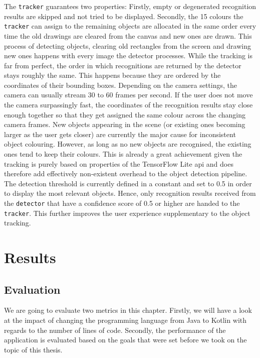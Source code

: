 \documentclass[
			   fontsize=11pt,
               paper=a4,
               bibliography=totoc,
               idxtotoc,
               headsepline,
               footsepline,
               footinclude=false,
               BCOR=12mm,
               DIV=13,
               openany,   %
               ]
               {scrbook}
\newcommand{\code}[1]{\lstinline[basicstyle = \ttfamily\small]{#1}} %
\begin{document}
The \code{tracker} guarantees two properties: Firstly, empty or degenerated recognition results are skipped and not tried to be displayed. Secondly, the 15 colours the \code{tracker} can assign to the remaining objects are  allocated in the same order every time the old drawings are cleared from the canvas and new ones are drawn. This process of detecting objects, clearing old rectangles from the screen and drawing new ones happens with every image the detector processes. While the tracking is far from perfect, the order in which recognitions are returned by the detector stays roughly the same. This happens because they are ordered by the coordinates of their bounding boxes. Depending on the camera settings, the camera can usually stream 30 to 60 frames per second. If the user does not move the camera surpassingly fast, the coordinates of the recognition results stay close enough together so that they get assigned the same colour across the changing camera frames. New  objects appearing in the scene (or existing ones becoming larger as the user gets closer) are currently the major cause for inconsistent object colouring. However, as long as no new objects are recognised, the existing ones tend to keep their colours. This is already a great achievement given the tracking is purely based on properties of the TensorFlow Lite \gls{api} and does therefore add effectively non-existent overhead to the object detection pipeline. \\

The detection threshold is currently defined in a constant and set to 0.5 in order to display the most relevant objects. Hence, only recognition results received from the \code{detector} that have a confidence score of 0.5 or higher are handed to the \code{tracker}. This further improves the user experience supplementary to the object tracking.

\part{Results}

\chapter{Evaluation}

We are going to evaluate two metrics in this chapter. Firstly, we will have a look at the impact of changing the programming language from Java to Kotlin with regards to the number of lines of code. Secondly, the performance of the application is evaluated based on the goals that were set before we took on the topic of this thesis.
\end{document}
